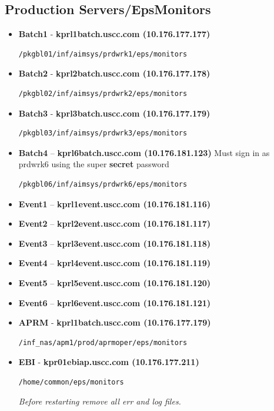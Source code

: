 \documentclass[12pt,twoside]{article}
\begin{document}
\subsection{Production Servers/EpsMonitors}
\label{sec:orgheadline9}
\footnotesize
\begin{itemize}
\item \textbf{Batch1} - \textbf{kprl1batch.uscc.com (10.176.177.177)}
\begin{verbatim}
/pkgbl01/inf/aimsys/prdwrk1/eps/monitors
\end{verbatim}
\item \textbf{Batch2} - \textbf{kprl2batch.uscc.com (10.176.177.178)}
\begin{verbatim}
/pkgbl02/inf/aimsys/prdwrk2/eps/monitors
\end{verbatim}
\item \textbf{Batch3} - \textbf{kprl3batch.uscc.com (10.176.177.179)}
\begin{verbatim}
/pkgbl03/inf/aimsys/prdwrk3/eps/monitors
\end{verbatim}
\item \textbf{Batch4} -- \textbf{kprl6batch.uscc.com (10.176.181.123)}
       Must sign in as prdwrk6 using the super \textbf{secret} password
\begin{verbatim}
/pkgbl06/inf/aimsys/prdwrk6/eps/monitors
\end{verbatim}
\item \textbf{Event1} -- \textbf{kprl1event.uscc.com (10.176.181.116)}
\item \textbf{Event2} -- \textbf{kprl2event.uscc.com (10.176.181.117)}
\item \textbf{Event3} -- \textbf{kprl3event.uscc.com (10.176.181.118)}
\item \textbf{Event4} -- \textbf{kprl4event.uscc.com (10.176.181.119)}
\item \textbf{Event5} -- \textbf{kprl5event.uscc.com (10.176.181.120)}
\item \textbf{Event6} -- \textbf{kprl6event.uscc.com (10.176.181.121)}
\item \textbf{APRM} - \textbf{kprl1batch.uscc.com (10.176.177.179)}
\begin{verbatim}
/inf_nas/apm1/prod/aprmoper/eps/monitors
\end{verbatim}
\item \textbf{EBI} - \textbf{kpr01ebiap.uscc.com (10.176.177.211)}
\begin{verbatim}
/home/common/eps/monitors
\end{verbatim}
\emph{Before restarting remove all err and log files.}
\end{itemize}
\normalsize
\end{document}
